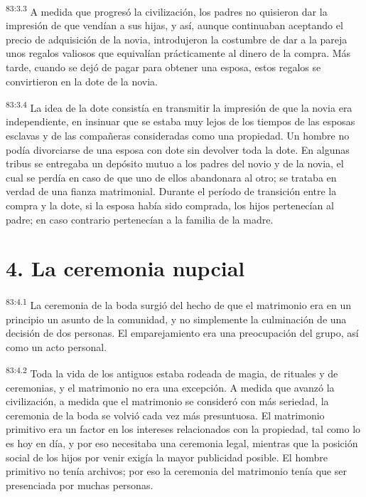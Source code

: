 \documentclass[twoside, 11pt]{book}
\begin{document}
\par
\textsuperscript{83:3.3} A medida que progresó la civilización, los padres no quisieron dar la impresión de que vendían a sus hijas, y así, aunque continuaban aceptando el precio de adquisición de la novia, introdujeron la costumbre de dar a la pareja unos regalos valiosos que equivalían prácticamente al dinero de la compra. Más tarde, cuando se dejó de pagar para obtener una esposa, estos regalos se convirtieron en la dote de la novia.

\par
\textsuperscript{83:3.4} La idea de la dote consistía en transmitir la impresión de que la novia era independiente, en insinuar que se estaba muy lejos de los tiempos de las esposas esclavas y de las compañeras consideradas como una propiedad. Un hombre no podía divorciarse de una esposa con dote sin devolver toda la dote. En algunas tribus se entregaba un depósito mutuo a los padres del novio y de la novia, el cual se perdía en caso de que uno de ellos abandonara al otro; se trataba en verdad de una fianza matrimonial. Durante el período de transición entre la compra y la dote, si la esposa había sido comprada, los hijos pertenecían al padre; en caso contrario pertenecían a la familia de la madre.

\section*{4. La ceremonia nupcial}
\par
\textsuperscript{83:4.1} La ceremonia de la boda surgió del hecho de que el matrimonio era en un principio un asunto de la comunidad, y no simplemente la culminación de una decisión de dos personas. El emparejamiento era una preocupación del grupo, así como un acto personal.

\par
\textsuperscript{83:4.2} Toda la vida de los antiguos estaba rodeada de magia, de rituales y de ceremonias, y el matrimonio no era una excepción. A medida que avanzó la civilización, a medida que el matrimonio se consideró con más seriedad, la ceremonia de la boda se volvió cada vez más presuntuosa. El matrimonio primitivo era un factor en los intereses relacionados con la propiedad, tal como lo es hoy en día, y por eso necesitaba una ceremonia legal, mientras que la posición social de los hijos por venir exigía la mayor publicidad posible. El hombre primitivo no tenía archivos; por eso la ceremonia del matrimonio tenía que ser presenciada por muchas personas.
\end{document}
